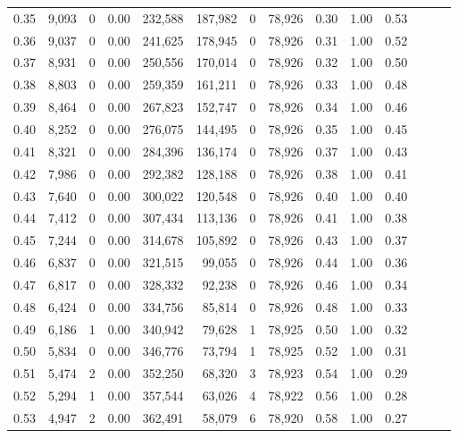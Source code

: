 \begin{tabular}{rrrrrrrrrrrrrr}
0.35 &  9,093 &      0 &  0.00 &  232,588 &  187,982 &       0 &  78,926 &  0.30 &  1.00 &      0.53 \\
0.36 &  9,037 &      0 &  0.00 &  241,625 &  178,945 &       0 &  78,926 &  0.31 &  1.00 &      0.52 \\
0.37 &  8,931 &      0 &  0.00 &  250,556 &  170,014 &       0 &  78,926 &  0.32 &  1.00 &      0.50 \\
0.38 &  8,803 &      0 &  0.00 &  259,359 &  161,211 &       0 &  78,926 &  0.33 &  1.00 &      0.48 \\
0.39 &  8,464 &      0 &  0.00 &  267,823 &  152,747 &       0 &  78,926 &  0.34 &  1.00 &      0.46 \\
0.40 &  8,252 &      0 &  0.00 &  276,075 &  144,495 &       0 &  78,926 &  0.35 &  1.00 &      0.45 \\
0.41 &  8,321 &      0 &  0.00 &  284,396 &  136,174 &       0 &  78,926 &  0.37 &  1.00 &      0.43 \\
0.42 &  7,986 &      0 &  0.00 &  292,382 &  128,188 &       0 &  78,926 &  0.38 &  1.00 &      0.41 \\
0.43 &  7,640 &      0 &  0.00 &  300,022 &  120,548 &       0 &  78,926 &  0.40 &  1.00 &      0.40 \\
0.44 &  7,412 &      0 &  0.00 &  307,434 &  113,136 &       0 &  78,926 &  0.41 &  1.00 &      0.38 \\
0.45 &  7,244 &      0 &  0.00 &  314,678 &  105,892 &       0 &  78,926 &  0.43 &  1.00 &      0.37 \\
0.46 &  6,837 &      0 &  0.00 &  321,515 &   99,055 &       0 &  78,926 &  0.44 &  1.00 &      0.36 \\
0.47 &  6,817 &      0 &  0.00 &  328,332 &   92,238 &       0 &  78,926 &  0.46 &  1.00 &      0.34 \\
0.48 &  6,424 &      0 &  0.00 &  334,756 &   85,814 &       0 &  78,926 &  0.48 &  1.00 &      0.33 \\
0.49 &  6,186 &      1 &  0.00 &  340,942 &   79,628 &       1 &  78,925 &  0.50 &  1.00 &      0.32 \\
0.50 &  5,834 &      0 &  0.00 &  346,776 &   73,794 &       1 &  78,925 &  0.52 &  1.00 &      0.31 \\
0.51 &  5,474 &      2 &  0.00 &  352,250 &   68,320 &       3 &  78,923 &  0.54 &  1.00 &      0.29 \\
0.52 &  5,294 &      1 &  0.00 &  357,544 &   63,026 &       4 &  78,922 &  0.56 &  1.00 &      0.28 \\
0.53 &  4,947 &      2 &  0.00 &  362,491 &   58,079 &       6 &  78,920 &  0.58 &  1.00 &      0.27 \\

\end{tabular}
